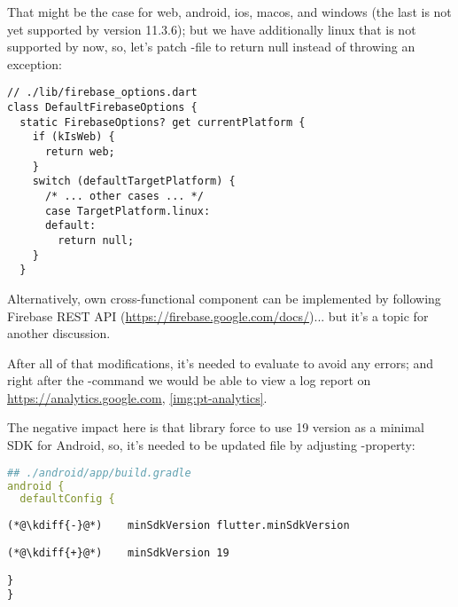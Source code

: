 \noindent That might be the case for web, android, ios, macos, and windows (the last is not yet supported by 
 version 11.3.6); but we have additionally linux that is not supported by now, so, let's patch 
-file to return null instead of throwing an exception:

\begin{lstlisting}
// ./lib/firebase_options.dart
class DefaultFirebaseOptions {
  static FirebaseOptions? get currentPlatform {
    if (kIsWeb) {
      return web;
    }
    switch (defaultTargetPlatform) {
      /* ... other cases ... */
      case TargetPlatform.linux:
      default:
        return null;
    }
  }
\end{lstlisting}

\noindent Alternatively, own cross-functional component can be implemented by following Firebase REST API 
(\href{https://firebase.google.com/docs/reference/rest/database}{https://firebase.google.com/docs/})... but it's a 
topic for another discussion.

After all of that modifications, it's needed to evaluate  to avoid any errors; and right after the
-command we would be able to view a log report on 
\href{https://analytics.google.com}{https://analytics.google.com}, \cref{img:pt-analytics}.


\noindent The negative impact here is that  library force to use 19 version as a minimal SDK for 
Android, so, it's needed to be updated  file by adjusting -property:

\begin{lstlisting}[language=yaml]
## ./android/app/build.gradle
android {
  defaultConfig {
\end{lstlisting}
{
\xpretocmd{\lstlisting}{\vspace{-12pt}}{}{}
\begin{lstlisting}[firstnumber=4, backgroundcolor=\color{backred}]
(*@\kdiff{-}@*)    minSdkVersion flutter.minSdkVersion
\end{lstlisting}
\begin{lstlisting}[firstnumber=4, backgroundcolor=\color{backgreen}]
(*@\kdiff{+}@*)    minSdkVersion 19
\end{lstlisting}
\begin{lstlisting}[firstnumber=5]
  }
}
\end{lstlisting}
}

